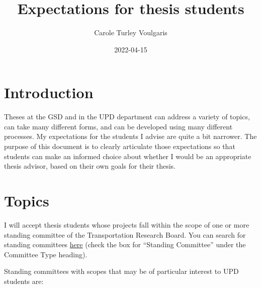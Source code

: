 \documentclass[]{tufte-book}
\title{Expectations for thesis students}
\author{Carole Turley Voulgaris}
\date{2022-04-15}
\begin{document}
\maketitle



{
\setcounter{tocdepth}{1}
\tableofcontents
}

\hypertarget{introduction}{%
\chapter{Introduction}\label{introduction}}

Theses at the GSD and in the UPD department can address a variety of topics, can take many different forms, and can be developed using many different processes. My expectations for the students I advise are quite a bit narrower. The purpose of this document is to clearly articulate those expectations so that students can make an informed choice about whether I would be an appropriate thesis advisor, based on their own goals for their thesis.

\hypertarget{topics}{%
\chapter{Topics}\label{topics}}

I will accept thesis students whose projects fall within the scope of one or more standing committee of the Transportation Research Board. You can search for standing committees \href{https://www.mytrb.org/OnlineDirectory/Committee/}{here} (check the box for ``Standing Committee'' under the Committee Type heading).

Standing committees with scopes that may be of particular interest to UPD students are:
\end{document}
